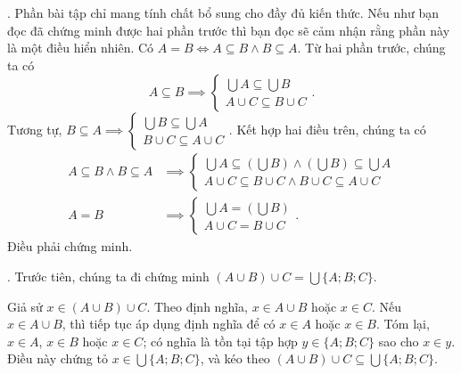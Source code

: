 . Phần bài tập chỉ mang tính chất bổ sung cho đầy đủ kiến thức. Nếu như bạn đọc đã chứng minh được hai phần trước thì bạn đọc sẽ cảm nhận rằng phần này là một điều hiển nhiên. Có $A = B \iff A \subseteq B \land B \subseteq A$. Từ hai phần trước, chúng ta có
\begin{equation*}
   A \subseteq B \implies \begin{cases}
      \bigcup A \subseteq \bigcup B \\
      A \cup C \subseteq B \cup C
   \end{cases}.
\end{equation*}
Tương tự, $B \subseteq A \implies \begin{cases}
      \bigcup B \subseteq \bigcup A \\
      B \cup C \subseteq A \cup C
   \end{cases}$.
Kết hợp hai điều trên, chúng ta có
\begin{align*}
   A \subseteq B \land B \subseteq A & \implies \begin{cases}
                                                   \bigcup A \subseteq \left(\bigcup B\right) \land \left(\bigcup B\right) \subseteq \bigcup A \\
                                                   A \cup C \subseteq B \cup C \land B \cup C \subseteq A \cup C
                                                \end{cases} \\
   A = B                             & \implies \begin{cases}
                                                   \bigcup A = \left(\bigcup B\right) \\
                                                   A \cup C = B \cup C
                                                \end{cases}.
\end{align*}
Điều phải chứng minh.

. Trước tiên, chúng ta đi chứng minh $(A \cup B) \cup C = \bigcup \{A; B; C\}$.

Giả sử $x \in (A \cup B) \cup C$. Theo định nghĩa, $x \in A \cup B$ hoặc $x \in C$. Nếu $x \in A \cup B$, thì tiếp tục áp dụng định nghĩa để có $x \in A$ hoặc $x \in B$. Tóm lại, $x \in A$, $x \in B$ hoặc $x \in C$; có nghĩa là tồn tại tập hợp $y \in \{A; B; C\}$ sao cho $x \in y$. Điều này chứng tỏ $x \in \bigcup \{A; B; C\}$, và kéo theo $(A \cup B) \cup C \subseteq \bigcup \{A; B; C\}$.

